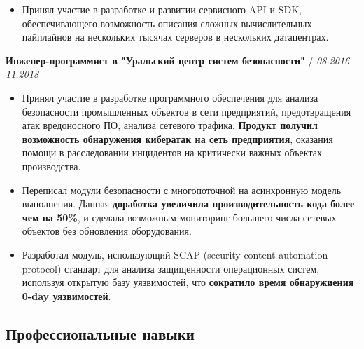 \documentclass[a4paper,10pt]{article}
\newcommand{\notice}[1]{{\textcolor{dark}{\textbf{#1}}}}
\newcommand{\info}[1]{{\textcolor{darkdark}{\textbf{#1}}}}
\begin{document}
\begin{adjustwidth}{10pt}{10pt}
\begin{itemize}
        \item Принял участие в разработке и развитии сервисного API и SDK, обеспечивающего возможность описания сложных вычислительных пайплайнов на нескольких тысячах серверов в нескольких датацентрах.

        \end{itemize}


        \notice{Инженер-программист в "Уральский центр систем безопасности"} / \textit{08.2016 – 11.2018}

        \begin{itemize}

        \item Принял участие в разработке программного обеспечения для анализа безопасности промышленных объектов в сети предприятий, предотвращения атак вредоносного ПО, анализа сетевого трафика. \info{Продукт получил возможность обнаружения кибератак на сеть предприятия}, оказания помощи в расследовании инцидентов на критически важных объектах производства.

        \item Переписал модули безопасности с многопоточной на асинхронную модель выполнения. Данная \info{доработка увеличила производительность кода более чем на 50\%}, и сделала возможным мониторинг большего числа сетевых объектов без обновления оборудования.

        \item Разработал модуль, использующий SCAP (security content automation protocol) стандарт для анализа защищенности операционных систем, используя открытую базу уязвимостей, что \info{сократило время обнаружиения 0-day уязвимостей}.

        \end{itemize}

    \end{adjustwidth}

\subsection*{Профессиональные навыки}
\end{document}
